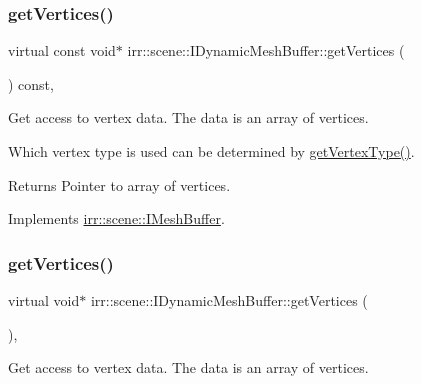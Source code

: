 \subsubsection{\texorpdfstring{get\+Vertices()}{getVertices()}\hspace{0.1cm}{\footnotesize\ttfamily [2/4]}}
{\footnotesize\ttfamily virtual const void$\ast$ irr\+::scene\+::\+I\+Dynamic\+Mesh\+Buffer\+::get\+Vertices (\begin{DoxyParamCaption}{ }\end{DoxyParamCaption}) const\hspace{0.3cm}{\ttfamily [inline]}, {\ttfamily [virtual]}}



Get access to vertex data. The data is an array of vertices. 

Which vertex type is used can be determined by \hyperlink{classirr_1_1scene_1_1IDynamicMeshBuffer_a3e7523774efaf9a177de6396dfdc14e2}{get\+Vertex\+Type()}. \begin{DoxyReturn}{Returns}
Pointer to array of vertices. 
\end{DoxyReturn}


Implements \hyperlink{classirr_1_1scene_1_1IMeshBuffer_a99891e516246b2cff13b362a435c8028}{irr\+::scene\+::\+I\+Mesh\+Buffer}.

\mbox{\label{classirr_1_1scene_1_1IDynamicMeshBuffer_a449643505823c7cfe793c5a82cde5fa4}} 
\subsubsection{\texorpdfstring{get\+Vertices()}{getVertices()}\hspace{0.1cm}{\footnotesize\ttfamily [3/4]}}
{\footnotesize\ttfamily virtual void$\ast$ irr\+::scene\+::\+I\+Dynamic\+Mesh\+Buffer\+::get\+Vertices (\begin{DoxyParamCaption}{ }\end{DoxyParamCaption})\hspace{0.3cm}{\ttfamily [inline]}, {\ttfamily [virtual]}}



Get access to vertex data. The data is an array of vertices. 

